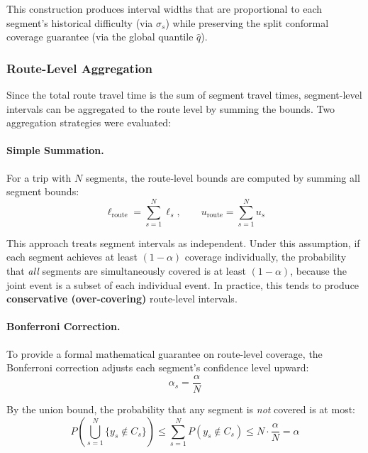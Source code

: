 This construction produces interval widths that are proportional to each segment's historical difficulty (via $\sigma_s$) while preserving the split conformal coverage guarantee (via the global quantile $\hat{q}$).

\subsubsection{Route-Level Aggregation}
\label{subsubsec:route_aggregation}

Since the total route travel time is the sum of segment travel times, segment-level intervals can be aggregated to the route level by summing the bounds. Two aggregation strategies were evaluated:

\paragraph{Simple Summation.}
For a trip with $N$ segments, the route-level bounds are computed by summing all segment bounds:
\begin{equation}
    \ell_{\text{route}} = \sum_{s=1}^{N} \ell_s, \qquad u_{\text{route}} = \sum_{s=1}^{N} u_s
    \label{eq:sum_aggregation}
\end{equation}

This approach treats segment intervals as independent. Under this assumption, if each segment achieves at least $(1-\alpha)$ coverage individually, the probability that \emph{all} segments are simultaneously covered is at least $(1-\alpha)$, because the joint event is a subset of each individual event. In practice, this tends to produce \textbf{conservative (over-covering)} route-level intervals.

\paragraph{Bonferroni Correction.}
To provide a formal mathematical guarantee on route-level coverage, the Bonferroni correction adjusts each segment's confidence level upward:
\begin{equation}
    \alpha_s = \frac{\alpha}{N}
    \label{eq:bonferroni}
\end{equation}

By the union bound, the probability that any segment is \emph{not} covered is at most:
\begin{equation}
    P\!\left(\bigcup_{s=1}^{N} \{y_s \notin C_s\}\right) \leq \sum_{s=1}^{N} P(y_s \notin C_s) \leq N \cdot \frac{\alpha}{N} = \alpha
    \label{eq:bonferroni_guarantee}
\end{equation}

